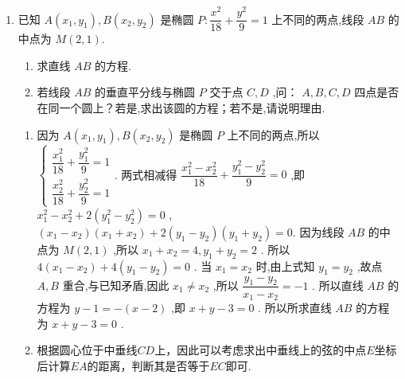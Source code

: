 \begin{enumerate}
\begin{jieda}
\begin{enumerate}
            故弦 ${AC}$ 垂直平分线为$y = \dfrac{25}{36}y_0(x-4)+y_0$，故$m = -\dfrac{16}{9}y_0$，而弦中点纵坐标$y_0 \in \left(-\dfrac{9}{5}, \dfrac{9}{5}\right)$，故$m \in \left(-\dfrac{16}{5}, \dfrac{16}{5}\right)$
        \end{enumerate}
    \end{jieda}
    \item 已知 $ A\left( {{x}_{1},{y}_{1}}\right) ,B\left( {{x}_{2},{y}_{2}}\right) $ 是椭圆 $ P : \dfrac{{x}^{2}}{18} + \dfrac{{y}^{2}}{9} = 1 $ 上不同的两点,线段 $ {AB} $ 的中点为 $ M\left( {2,1}\right) $.
    \begin{enumerate}
        \item 求直线 $ {AB} $ 的方程.
        \item 若线段 $ {AB} $ 的垂直平分线与椭圆 $ P $ 交于点 $ C,D $ ,问： $ A,B,C,D $ 四点是否在同一个圆上？若是,求出该圆的方程；若不是,请说明理由.
    \end{enumerate}
    \begin{jieda}
        \begin{enumerate}
            \item 因为 $ A\left( {{x}_{1},{y}_{1}}\right) ,B\left( {{x}_{2},{y}_{2}}\right) $ 是椭圆 $ P $ 上不同的两点,所以 $\left \{\begin{array}{l}
                    \dfrac{{x}_{1}^{2}}{18} + \dfrac{{y}_{1}^{2}}{9} = 1  \\
                    \dfrac{{x}_{2}^{2}}{18} + \dfrac{{y}_{2}^{2}}{9} = 1
            \end{array}\right.$.
            两式相减得 $ \dfrac{{x}_{1}^{2} - {x}_{2}^{2}}{18} + \dfrac{{y}_{1}^{2} - {y}_{2}^{2}}{9} = 0 $ ,即 $ {x}_{1}^{2} - {x}_{2}^{2} + 2\left( {{y}_{1}^{2} - {y}_{2}^{2}}\right)  = 0 $ ,
            $ \left( {{x}_{1} - {x}_{2}}\right) \left( {{x}_{1} + {x}_{2}}\right)  + 2\left( {{y}_{1} - {y}_{2}}\right) \left( {{y}_{1} + {y}_{2}}\right)  = 0. $
            因为线段 $ {AB} $ 的中点为 $ M\left( {2,1}\right) $ ,所以 $ {x}_{1} + {x}_{2} = 4,{y}_{1} + {y}_{2} = 2 $ .
            所以 $ 4\left( {{x}_{1} - {x}_{2}}\right)  + 4\left( {{y}_{1} - {y}_{2}}\right)  = 0 $ .
            当 $ {x}_{1} = {x}_{2} $ 时,由上式知 $ {y}_{1} = {y}_{2} $ ,故点 $ A,B $ 重合,与已知矛盾,因此 $ {x}_{1} \neq  {x}_{2} $ ,所以 $ \dfrac{{y}_{1} - {y}_{2}}{{x}_{1} - {x}_{2}} =  - 1 $ .
            所以直线 $ {AB} $ 的方程为 $ y - 1 =  - \left( {x - 2}\right) $ ,即 $ x + y - 3 = 0 $ .
            所以所求直线 $ {{AB}} $ 的方程为 $ x + y - 3 = 0 $ .
            \item 
            根据圆心位于中垂线$CD$上，因此可以考虑求出中垂线上的弦的中点$E$坐标后计算$EA$的距离，判断其是否等于$EC$即可. 
            

\end{enumerate}
\end{jieda}
\end{enumerate}
